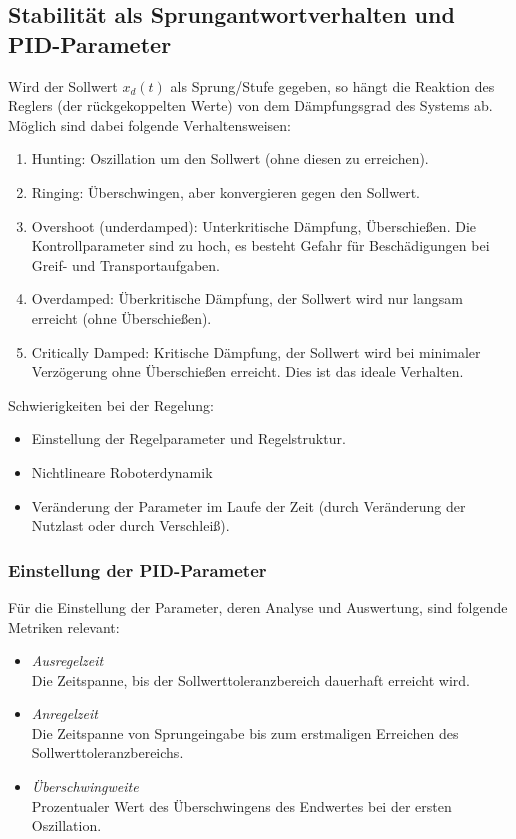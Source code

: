 	\subsection{Stabilität als Sprungantwortverhalten und PID-Parameter}
		Wird der Sollwert \( x_d(t) \) als Sprung/Stufe gegeben, so hängt die Reaktion des Reglers (\bzw der rückgekoppelten Werte) von dem Dämpfungsgrad des Systems ab. Möglich sind dabei folgende Verhaltensweisen:
		\begin{enumerate}
			\item Hunting: Oszillation um den Sollwert (ohne diesen zu erreichen).
			\item Ringing: Überschwingen, aber konvergieren gegen den Sollwert.
			\item Overshoot (underdamped): Unterkritische Dämpfung, Überschießen. Die Kontrollparameter sind zu hoch, es besteht Gefahr für Beschädigungen bei Greif- und Transportaufgaben.
			\item Overdamped: Überkritische Dämpfung, der Sollwert wird nur langsam erreicht (ohne Überschießen).
			\item Critically Damped: Kritische Dämpfung, der Sollwert wird bei minimaler Verzögerung ohne Überschießen erreicht. Dies ist das ideale Verhalten.
		\end{enumerate}

		Schwierigkeiten bei der Regelung:
		\begin{itemize}
			\item Einstellung der Regelparameter und Regelstruktur.
			\item Nichtlineare Roboterdynamik
			\item Veränderung der Parameter im Laufe der Zeit (\zB durch Veränderung der Nutzlast oder durch Verschleiß).
		\end{itemize}

		\subsubsection{Einstellung der PID-Parameter}
			Für die Einstellung der Parameter, \bzw deren Analyse und Auswertung, sind folgende Metriken relevant:
			\begin{itemize}
				\item \emph{Ausregelzeit} \\ Die Zeitspanne, bis der Sollwerttoleranzbereich dauerhaft erreicht wird.
				\item \emph{Anregelzeit} \\ Die Zeitspanne von Sprungeingabe bis zum erstmaligen Erreichen des Sollwerttoleranzbereichs.
				\item \emph{Überschwingweite} \\ Prozentualer Wert des Überschwingens des Endwertes bei der ersten Oszillation.
			\end{itemize}

